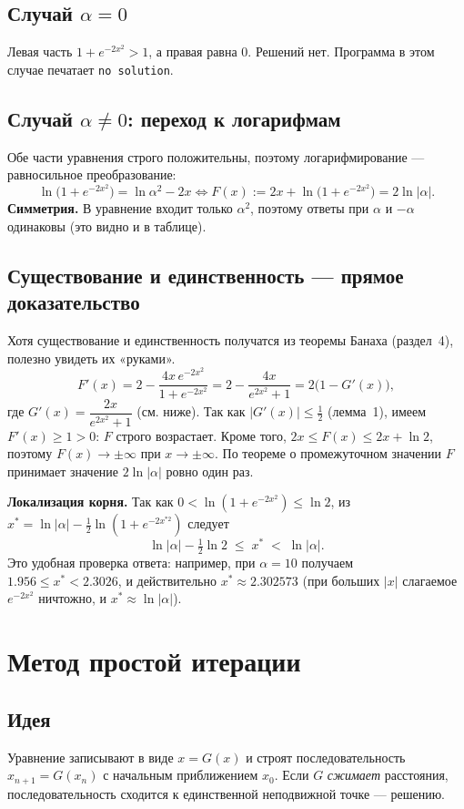 \documentclass[11pt,a4paper]{article}
\begin{document}
\subsection{Случай $\alpha=0$}
Левая часть $1+e^{-2x^2}>1$, а правая равна $0$. Решений нет. Программа в этом случае печатает \texttt{no solution}.

\subsection{Случай $\alpha\ne0$: переход к логарифмам}
Обе части уравнения строго положительны, поэтому логарифмирование — равносильное преобразование:
\[
\ln\bigl(1+e^{-2x^2}\bigr)=\ln\alpha^2-2x
\iff
F(x):=2x+\ln\bigl(1+e^{-2x^2}\bigr)=2\ln|\alpha|.
\]
\textbf{Симметрия.} В уравнение входит только $\alpha^2$, поэтому ответы при $\alpha$ и $-\alpha$ одинаковы (это видно и в таблице).

\subsection{Существование и единственность — прямое доказательство}
Хотя существование и единственность получатся из теоремы Банаха (раздел~4), полезно увидеть их «руками».
\[
F'(x)=2-\frac{4x\,e^{-2x^2}}{1+e^{-2x^2}}=2-\frac{4x}{e^{2x^2}+1}=2\bigl(1-G'(x)\bigr),
\]
где $G'(x)=\dfrac{2x}{e^{2x^2}+1}$ (см. ниже). Так как $|G'(x)|\le\frac12$ (лемма~1), имеем $F'(x)\ge1>0$:
$F$ строго возрастает. Кроме того, $2x\le F(x)\le 2x+\ln2$, поэтому $F(x)\to\pm\infty$ при $x\to\pm\infty$.
По теореме о промежуточном значении $F$ принимает значение $2\ln|\alpha|$ ровно один раз.

\textbf{Локализация корня.} Так как $0<\ln(1+e^{-2x^2})\le\ln2$, из $x^*=\ln|\alpha|-\frac12\ln(1+e^{-2x^{*2}})$ следует
\[
\ln|\alpha|-\tfrac12\ln2\;\le\;x^*\;<\;\ln|\alpha|.
\]
Это удобная проверка ответа: например, при $\alpha=10$ получаем $1.956\le x^*<2.3026$, и действительно $x^*\approx2.302573$
(при больших $|x|$ слагаемое $e^{-2x^2}$ ничтожно, и $x^*\approx\ln|\alpha|$).

\section{Метод простой итерации}
\subsection{Идея}
Уравнение записывают в виде $x=G(x)$ и строят последовательность $x_{n+1}=G(x_n)$ с начальным приближением $x_0$.
Если $G$ \emph{сжимает} расстояния, последовательность сходится к единственной неподвижной точке — решению.
\end{document}
